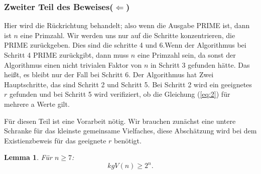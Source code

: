 \documentclass[12pt,oneside]{article}
\newtheorem{lemma}[theorem]{Lemma}
\theoremstyle{remark}
\theoremstyle{definition}
\begin{document}
\subsubsection{Zweiter Teil des Beweises($\Leftarrow$)}

Hier wird die Rückrichtung behandelt; also  wenn die Ausgabe PRIME ist, dann ist $n$ eine Primzahl. Wir werden uns nur auf die Schritte konzentrieren, die PRIME zurückgeben. Dies sind die schritte 4 und 6.\newline\newline Wenn der Algorithmus bei Schritt 4 PRIME zurückgibt, dann muss $n$ eine Primzahl sein, da sonst der Algorithmus einen nicht trivialen Faktor von $n$ in Schritt 3 gefunden hätte. Das heißt, es bleibt nur der Fall bei Schritt 6. Der Algorithmus hat Zwei Hauptschritte, das sind Schritt 2 und Schritt 5. Bei Schritt 2 wird ein geeignetes $r$ gefunden und bei Schritt 5 wird verifiziert, ob die Gleichung (\ref{eq:2}) für mehrere a Werte gilt.    

Für diesen Teil ist eine Vorarbeit nötig. Wir brauchen zunächst eine untere Schranke für das kleinste gemeinsame Vielfaches, diese Abschätzung wird bei dem Existienzbeweis für das geeignete $r$ benötigt.


\begin{lemma}\label{lemma_1}
Für $n \geq 7$:\newline
\begin{equation}
    kgV(n) \geq 2^n.  
\end{equation}
\end{lemma}
\end{document}
